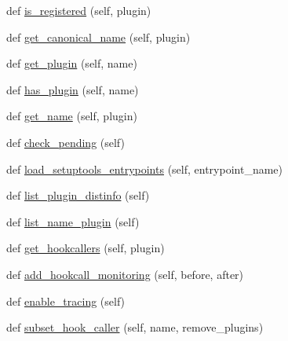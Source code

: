 \begin{DoxyCompactItemize}
\item 
def \hyperlink{classpluggy_1_1manager_1_1_plugin_manager_a42f02527adb6b90ec57f4ff3d6235a98}{is\+\_\+registered} (self, plugin)
\item 
def \hyperlink{classpluggy_1_1manager_1_1_plugin_manager_a362f59ef5ac6d91a00891a23dc51af6a}{get\+\_\+canonical\+\_\+name} (self, plugin)
\item 
def \hyperlink{classpluggy_1_1manager_1_1_plugin_manager_a06f6db97612dbde40933aa41c570ea46}{get\+\_\+plugin} (self, name)
\item 
def \hyperlink{classpluggy_1_1manager_1_1_plugin_manager_a9b10a6e7339d19ada0f2b2eff36e612d}{has\+\_\+plugin} (self, name)
\item 
def \hyperlink{classpluggy_1_1manager_1_1_plugin_manager_a46be59b9190e87a0d3007a13bd989f56}{get\+\_\+name} (self, plugin)
\item 
def \hyperlink{classpluggy_1_1manager_1_1_plugin_manager_a7d8054b9744509c85316f3d3611f35c4}{check\+\_\+pending} (self)
\item 
def \hyperlink{classpluggy_1_1manager_1_1_plugin_manager_a057411df662fe558e57be1b8ab394369}{load\+\_\+setuptools\+\_\+entrypoints} (self, entrypoint\+\_\+name)
\item 
def \hyperlink{classpluggy_1_1manager_1_1_plugin_manager_ade6b546451db9052096e13af1f002e75}{list\+\_\+plugin\+\_\+distinfo} (self)
\item 
def \hyperlink{classpluggy_1_1manager_1_1_plugin_manager_af49b57685654d86b409fbc4280f6bf10}{list\+\_\+name\+\_\+plugin} (self)
\item 
def \hyperlink{classpluggy_1_1manager_1_1_plugin_manager_a4a86b09e4c58368f6f0917fac70d439a}{get\+\_\+hookcallers} (self, plugin)
\item 
def \hyperlink{classpluggy_1_1manager_1_1_plugin_manager_ae4851e61bfbad4b55c2299e4efb57441}{add\+\_\+hookcall\+\_\+monitoring} (self, before, after)
\item 
def \hyperlink{classpluggy_1_1manager_1_1_plugin_manager_ad04e0ea4995ca3f7aa7b835cb888faeb}{enable\+\_\+tracing} (self)
\item 
def \hyperlink{classpluggy_1_1manager_1_1_plugin_manager_a100cd4b830d2446bc7893cd35f7270c5}{subset\+\_\+hook\+\_\+caller} (self, name, remove\+\_\+plugins)
\end{DoxyCompactItemize}
